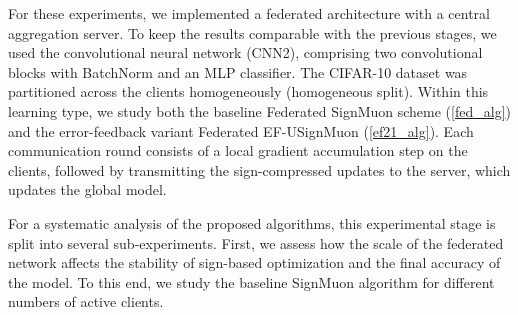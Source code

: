 \documentclass{article}
\begin{document}
For these experiments, we implemented a federated architecture with a central aggregation server. To keep the results comparable with the previous stages, we used the convolutional neural network (CNN2), comprising two convolutional blocks with BatchNorm and an MLP classifier. The CIFAR-10 dataset was partitioned across the clients homogeneously (homogeneous split). Within this learning type, we study both the baseline Federated SignMuon scheme (\cref{fed_alg}) and the error-feedback variant Federated EF-USignMuon (\cref{ef21_alg}). Each communication round consists of a local gradient accumulation step on the clients, followed by transmitting the sign-compressed updates to the server, which updates the global model.

For a systematic analysis of the proposed algorithms, this experimental stage is split into several sub-experiments. First, we assess how the scale of the federated network affects the stability of sign-based optimization and the final accuracy of the model. To this end, we study the baseline SignMuon algorithm for different numbers of active clients.
\end{document}
